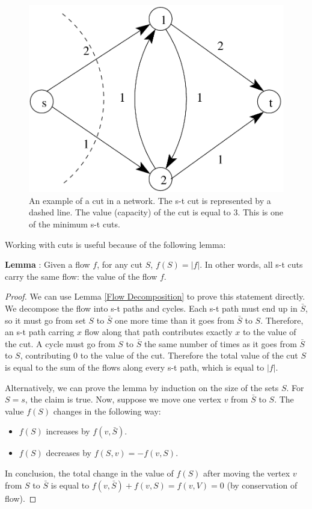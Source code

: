 \documentclass{article}
\begin{document}
\begin{figure}[h]
\begin{center}
\includegraphics{ex_cut2.png}
\caption{An example of a cut in a network. The s-t cut is represented
  by a dashed line. The value (capacity) of the cut is equal to
  3. This is one of the minimum s-t cuts.}
\label{fig:ex_cut2}
\end{center}
\end{figure}


Working with cuts is useful because of the following lemma:

\textbf{Lemma} \label{All s-t Cuts Same}:
Given a flow $f$, for any cut $S$, $f(S) = |f|$.  In other words,
all s-t cuts  carry the same flow: the value of the flow $f$.

\begin{proof}
We can use Lemma \ref{Flow Decomposition} to prove this statement directly.
We decompose the flow into s-t paths and cycles.  Each s-t path must
end up in $\bar{S}$, so it must go from set $S$ to $\bar{S}$ one more
time than it goes from $\bar{S}$ to $S$.  Therefore, an s-t path
carring $x$ flow along that path contributes exactly $x$ to the value
of the cut.  
A cycle must go from $S$ to $\bar{S}$ the same number of
times as it goes from $\bar{S}$ to $S$, contributing 0 to the value of
the cut.   
Therefore the total value of the cut $S$ is equal to the sum of the
flows along every s-t path, which is equal to $|f|$.  

Alternatively, we can prove the lemma by induction on the size of the
  sets $S$.    For $S={s}$, the claim is true. Now, suppose we move
  one vertex $v$ from $\bar{S}$ to $S$.  The value $f(S)$ changes
  in the following way:
  \begin{itemize}
    \item
      $f(S)$ increases by $f(v,\bar{S})$.
    \item
      $f(S)$ decreases by $f(S,v) = -f(v,S)$.
  \end{itemize}
  In conclusion, the total change in the value of $f(S)$  after moving the
  vertex $v$ from $S$ to $\bar{S}$ is equal to
 $f(v,\bar{S})+f(v,S)=f(v,V)=0$ (by conservation of flow).
\end{proof}
\end{document}
